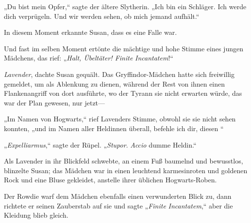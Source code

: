 „Du bist mein Opfer,“ sagte der ältere Slytherin. „Ich bin ein Schläger. Ich werde dich verprügeln. Und wir werden sehen, ob mich jemand aufhält.“

In diesem Moment erkannte Susan, dass es eine Falle war.

Und fast im selben Moment ertönte die mächtige und hohe Stimme eines jungen Mädchens, das rief: „\emph{Halt, Übeltäter! Finite} \emph{Incantatem}!“

\emph{Lavender}, dachte Susan gequält. Das Gryffindor-Mädchen hatte sich freiwillig gemeldet, um als Ablenkung zu dienen, während der Rest von ihnen einen Flankenangriff von dort ausführte, wo der Tyrann sie nicht erwarten würde, das war der Plan gewesen, nur jetzt—

„Im Namen von Hogwarts,“ rief Lavenders Stimme, obwohl sie sie nicht sehen konnten, „und im Namen aller Heldinnen überall, befehle ich dir, diesen “

„\emph{Expelliarmus},“ sagte der Rüpel. „\emph{Stupor}. \emph{Accio} dumme Heldin.“

Als Lavender in ihr Blickfeld schwebte, an einem Fuß baumelnd und bewusstlos, blinzelte Susan; das Mädchen war in einen leuchtend karmesinroten und goldenen Rock und eine Bluse gekleidet, anstelle ihrer üblichen Hogwarts-Roben.

Der Rowdie warf dem Mädchen ebenfalls einen verwunderten Blick zu, dann richtete er seinen Zauberstab auf sie und sagte „\emph{Finite} \emph{Incantatem},“ aber die Kleidung blieb gleich.

